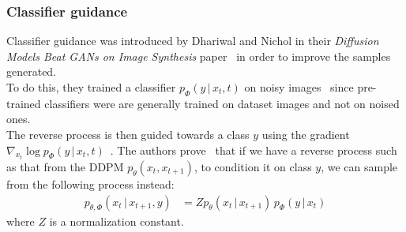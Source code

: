 \documentclass[twoside]{article}
\numberwithin{equation}{section}
\numberwithin{figure}{section}
\begin{document}
\subsubsection{Classifier guidance}
Classifier guidance was introduced by Dhariwal and Nichol in their \textit{Diffusion Models Beat GANs on Image Synthesis} paper~\cite{dhariwal2021diffusion} in order to improve the samples generated. \\
To do this, they trained a classifier $p_\Phi (y \, | \, x_t, t)$ on noisy images~\cite{dhariwal2021diffusion} since pre-trained classifiers were are generally trained on dataset images and not on noised ones. \\
The reverse process is then guided towards a class $y$ using the gradient $\nabla_{x_t} \log p_\Phi (y \, | \, x_t, t)$~\cite{dhariwal2021diffusion}.
The authors prove~\cite{dhariwal2021diffusion} that if we have a reverse process such as that from the DDPM $p_\theta (x_t, x_{t+1})$, to condition it on class $y$, we can sample from the following process instead:
\begin{align}
  p_{\theta, \Phi} (x_t \, | \, x_{t+1}, y) &= Z p_\theta (x_t \, | \, x_{t+1}) \, p_\Phi(y \, | \, x_t)
\end{align}
where $Z$ is a normalization constant.
\end{document}
